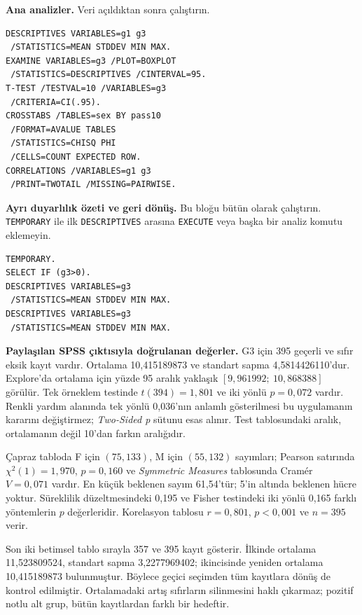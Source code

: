 \par\noindent\begin{minipage}{\linewidth}
\textbf{Ana analizler.} Veri açıldıktan sonra çalıştırın.

\begin{lstlisting}[style=prismSPSS]
DESCRIPTIVES VARIABLES=g1 g3
 /STATISTICS=MEAN STDDEV MIN MAX.
EXAMINE VARIABLES=g3 /PLOT=BOXPLOT
 /STATISTICS=DESCRIPTIVES /CINTERVAL=95.
T-TEST /TESTVAL=10 /VARIABLES=g3
 /CRITERIA=CI(.95).
CROSSTABS /TABLES=sex BY pass10
 /FORMAT=AVALUE TABLES
 /STATISTICS=CHISQ PHI
 /CELLS=COUNT EXPECTED ROW.
CORRELATIONS /VARIABLES=g1 g3
 /PRINT=TWOTAIL /MISSING=PAIRWISE.
\end{lstlisting}
\end{minipage}\par

\par\noindent\begin{minipage}{\linewidth}
\textbf{Ayrı duyarlılık özeti ve geri dönüş.} Bu bloğu bütün olarak
çalıştırın. \texttt{TEMPORARY} ile ilk \texttt{DESCRIPTIVES}
arasına \texttt{EXECUTE} veya başka bir analiz komutu eklemeyin.

\begin{lstlisting}[style=prismSPSS]
TEMPORARY.
SELECT IF (g3>0).
DESCRIPTIVES VARIABLES=g3
 /STATISTICS=MEAN STDDEV MIN MAX.
DESCRIPTIVES VARIABLES=g3
 /STATISTICS=MEAN STDDEV MIN MAX.
\end{lstlisting}
\end{minipage}\par

\begin{outputguidebox}
\textbf{Paylaşılan SPSS çıktısıyla doğrulanan değerler.}
G3 için 395 geçerli ve sıfır eksik kayıt vardır. Ortalama
10,415189873 ve standart sapma 4,5814426110'dur. Explore'da
ortalama için yüzde 95 aralık yaklaşık $[9{,}961992;\ 10{,}868388]$
görülür. Tek örneklem testinde $t(394)=1{,}801$ ve iki yönlü
$p=0{,}072$ vardır. Renkli yardım alanında tek yönlü 0,036'nın
anlamlı gösterilmesi bu uygulamanın kararını değiştirmez;
\emph{Two-Sided p} sütunu esas alınır. Test tablosundaki aralık,
ortalamanın değil 10'dan farkın aralığıdır.

Çapraz tabloda F için $(75,133)$, M için $(55,132)$ sayımları;
Pearson satırında $\chi^2(1)=1{,}970$, $p=0{,}160$ ve
\emph{Symmetric Measures} tablosunda Cramér $V=0{,}071$ vardır.
En küçük beklenen sayım 61,54'tür; 5'in altında beklenen hücre
yoktur. Süreklilik düzeltmesindeki 0,195 ve Fisher testindeki
iki yönlü 0,165 farklı yöntemlerin $p$ değerleridir.
Korelasyon tablosu $r=0{,}801$, $p<0{,}001$ ve $n=395$ verir.

Son iki betimsel tablo sırayla 357 ve 395 kayıt gösterir.
İlkinde ortalama 11,523809524, standart sapma 3,2277969402;
ikincisinde yeniden ortalama 10,415189873 bulunmuştur.
Böylece geçici seçimden tüm kayıtlara dönüş de kontrol edilmiştir.
Ortalamadaki artış sıfırların silinmesini haklı çıkarmaz;
pozitif notlu alt grup, bütün kayıtlardan farklı bir hedeftir.
\end{outputguidebox}

